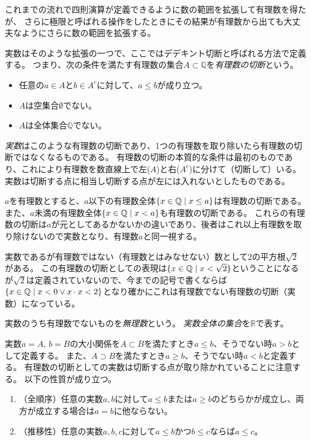これまでの流れで四則演算が定義できるように数の範囲を拡張して有理数を得たが、
さらに極限と呼ばれる操作をしたときにその結果が有理数から出ても大丈夫なようにさらに数の範囲を拡張する。

実数はそのような拡張の一つで、ここではデデキント切断と呼ばれる方法で定義する。
つまり、次の条件を満たす有理数の集合$A \subset \mathbb{Q}$を\emph{有理数の切断}という。
\begin{itemize}
\item
任意の$a \in A$と$b \in A^c$に対して、$a \le b$が成り立つ。
\item
$A$は空集合$\emptyset$でない。
\item
$A$は全体集合$\mathbb{Q}$でない。
\end{itemize}
\emph{実数}はこのような有理数の切断であり、1つの有理数を取り除いたら有理数の切断ではなくなるものである。
有理数の切断の本質的な条件は最初のものであり、これにより有理数を数直線上で左($A$)と右($A^c$)に分けて（切断して）いる。
実数は切断する点に相当し切断する点が左には入れないとしたものである。

$a$を有理数とすると、$a$以下の有理数全体$\{ x \in \mathbb{Q} \mid x \le a \}$は有理数の切断である。
また、$a$未満の有理数全体$\{ x \in \mathbb{Q} \mid x < a \}$も有理数の切断である。
これらの有理数の切断は$a$が元としてあるかないかの違いであり、後者はこれ以上有理数を取り除けないので実数となり、有理数$a$と同一視する。

\begin{example}
実数であるが有理数ではない（有理数とはみなせない）数として$2$の平方根$\sqrt{2}$がある。
この有理数の切断としての表現は$\{ x \in \mathbb{Q} \mid x < \sqrt{2} \}$ということになるが$\sqrt{2}$は定義されていないので、今までの記号で書くならば$\{ x \in \mathbb{Q} \mid x < 0 \lor x\cdot x < 2 \}$となり確かにこれは有理数でない有理数の切断（実数）になっている。
\end{example}

実数のうち有理数でないものを\emph{無理数}という。
\emph{実数全体の集合}を$\mathbb{R}$で表す。

実数$a = A$, $b = B$の大小関係を$A \subset B$を満たすとき$a \le b$、そうでない時$a > b$として定義する。
また、$A \supset B$を満たすとき$a \ge b$、そうでない時$a < b$と定義する。
有理数の切断としての実数は切断する点が取り除かれていることに注意する。
以下の性質が成り立つ。
\begin{enumerate}
\item
（全順序）任意の実数$a, b$に対して$a \le b$または$a \ge b$のどちらかが成立し、両方が成立する場合は$a = b$に他ならない。
\item
（推移性）任意の実数$a, b, c$に対して$a \le b$かつ$b \le c$ならば$a \le c$。
\end{enumerate}

